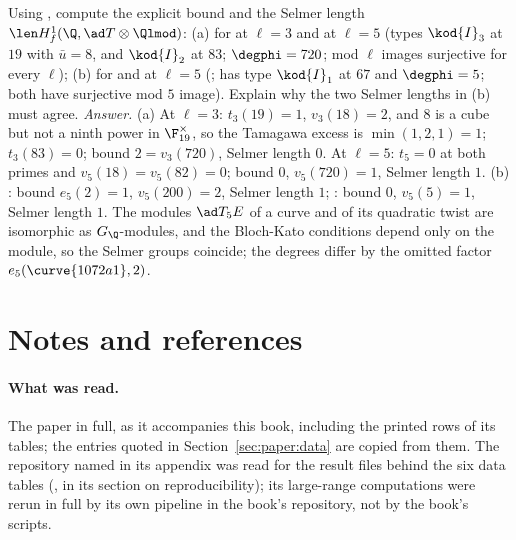 \begin{sloppypar}
\begin{exercise}\label{ex:paper:selmer-examples}
Using , compute the explicit bound and the Selmer length $\len H^1_f(\Q,\ad T\otimes\Qlmod)$: (a) for  at $\ell=3$ and at $\ell=5$ (types $\kod{I}_3$ at $19$ with
$\bar u=8$, and $\kod{I}_2$ at $83$; $\degphi=720$; mod $\ell$ images surjective for every $\ell$); (b) for  and  at $\ell=5$ (;  has type
$\kod{I}_1$ at $67$ and $\degphi=5$; both have surjective mod $5$ image). Explain why the two Selmer lengths in (b) must agree.
\emph{Answer.} (a) At $\ell=3$: $t_3(19)=1$, $v_3(18)=2$, and $8$ is a cube but not a ninth power in $\F_{19}^\times$, so the Tamagawa excess is $\min(1,2,1)=1$; $t_3(83)=0$; bound $2=v_3(720)$,
Selmer length $0$. At $\ell=5$: $t_5=0$ at both primes and $v_5(18)=v_5(82)=0$; bound $0$, $v_5(720)=1$, Selmer length $1$. (b) : bound $e_5(2)=1$, $v_5(200)=2$, Selmer length $1$;
: bound $0$, $v_5(5)=1$, Selmer length $1$. The modules $\ad T_5E$ of a curve and of its quadratic twist are isomorphic as $G_\Q$-modules, and the Bloch-Kato conditions depend only on
the module, so the Selmer groups coincide; the degrees differ by the omitted factor $e_5(\curve{1072a1},2)$.
\end{exercise}

\section{Notes and references}\label{sec:paper:notes}

\paragraph{What was read.} The paper in full, as it accompanies this book, including the printed rows of its tables; the entries quoted in
Section~\ref{sec:paper:data} are copied from them. The repository named in its appendix was read for the result files behind the six data tables
(, in its section on reproducibility); its large-range computations were rerun in full by its own pipeline in the book's
repository, not by the book's scripts.


\end{sloppypar}
